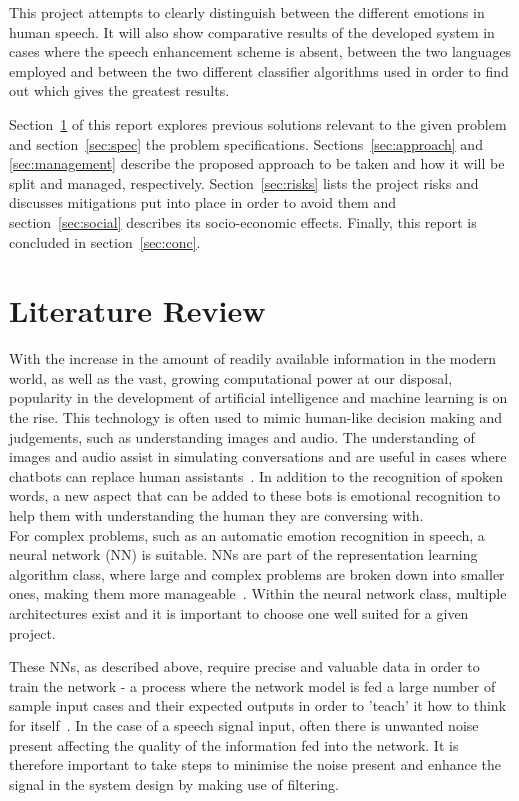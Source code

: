 \documentclass[10pt,twocolumn]{witseiepaper}
\begin{document}
This project attempts to clearly distinguish between the different emotions in human speech. It will also show comparative results of the developed system in cases where the speech enhancement scheme is absent, between the two languages employed and between the two different classifier algorithms used in order to find out which gives the greatest results.

Section~\ref{sec:lr} of this report explores previous solutions relevant to the given problem and section~\ref{sec:spec} the problem specifications. Sections~\ref{sec:approach} and \ref{sec:management} describe the proposed approach to be taken and how it will be split and managed, respectively. Section~\ref{sec:risks} lists the project risks and discusses mitigations put into place in order to avoid them and section~\ref{sec:social} describes its socio-economic effects. Finally, this report is concluded in section~\ref{sec:conc}.

\section{Literature Review}\label{sec:lr}
With the increase in the amount of readily available information in the modern world, as well as the vast, growing computational power at our disposal, popularity in the development of artificial intelligence and machine learning is on the rise. This technology is often used to mimic human-like decision making and judgements, such as understanding images and audio. The understanding of images and audio assist in simulating conversations and are useful in cases where chatbots can replace human assistants~\cite{chatbot}. In addition to the recognition of spoken words, a new aspect that can be added to these bots is emotional recognition to help them with understanding the human they are conversing with.
\hfill\\

For complex problems, such as an automatic emotion recognition in  speech, a neural network (NN) is suitable. NNs are part of the representation learning algorithm class, where large and complex problems are broken down into smaller ones, making them more manageable~\cite{tensorIntro}. Within the neural network class, multiple architectures exist and it is important to choose one well suited for a given project.

These NNs, as described above, require precise and valuable data in order to train the network - a process where the network model is fed a large number of sample input cases and their expected outputs in order to 'teach' it how to think for itself~\cite{tensorIntro}. In the case of a speech signal input, often there is unwanted noise present affecting the quality of the information fed into the network. It is therefore important to take steps to minimise the noise present and enhance the signal in the system design by making use of filtering.
\end{document}

